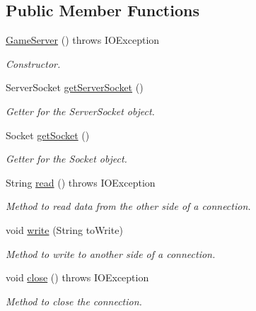 \subsection*{Public Member Functions}
\begin{DoxyCompactItemize}
\item 
\hyperlink{classGameServer_a529ab6037cd52da73ae053b36410c85e}{Game\+Server} ()  throws I\+O\+Exception 
\begin{DoxyCompactList}\small\item\em Constructor. \end{DoxyCompactList}\item 
Server\+Socket \hyperlink{classGameServer_a21aa851ead251173e7989c2a2fed0482}{get\+Server\+Socket} ()
\begin{DoxyCompactList}\small\item\em Getter for the Server\+Socket object. \end{DoxyCompactList}\item 
Socket \hyperlink{classGameServer_a7432bdbfdab3b4de5b087ccc7ec0d6c0}{get\+Socket} ()
\begin{DoxyCompactList}\small\item\em Getter for the Socket object. \end{DoxyCompactList}\item 
String \hyperlink{classGameServer_adc364b22489b8e52afe8697c5b92d10c}{read} ()  throws I\+O\+Exception 
\begin{DoxyCompactList}\small\item\em Method to read data from the other side of a connection. \end{DoxyCompactList}\item 
void \hyperlink{classGameServer_a7eb6fac8073558454fc9d4eb1ad78520}{write} (String to\+Write)
\begin{DoxyCompactList}\small\item\em Method to write to another side of a connection. \end{DoxyCompactList}\item 
void \hyperlink{classGameServer_af368cef66168f8b95a11589c0809adfe}{close} ()  throws I\+O\+Exception \hypertarget{classGameServer_af368cef66168f8b95a11589c0809adfe}{}\label{classGameServer_af368cef66168f8b95a11589c0809adfe}

\begin{DoxyCompactList}\small\item\em Method to close the connection. \end{DoxyCompactList}\end{DoxyCompactItemize}


